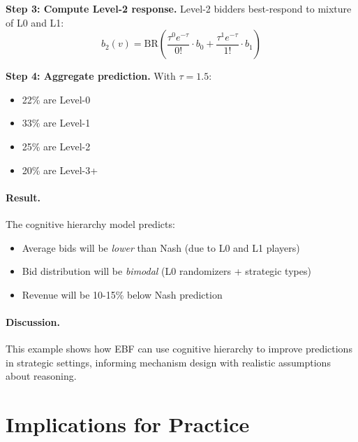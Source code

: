 \textbf{Step 3: Compute Level-2 response.}
Level-2 bidders best-respond to mixture of L0 and L1:
\begin{equation}
b_2(v) = \text{BR}\left(\frac{\tau^0 e^{-\tau}}{0!} \cdot b_0 + \frac{\tau^1 e^{-\tau}}{1!} \cdot b_1\right)
\end{equation}

\textbf{Step 4: Aggregate prediction.}
With $\tau = 1.5$:
\begin{itemize}[nosep]
\item 22\% are Level-0
\item 33\% are Level-1
\item 25\% are Level-2
\item 20\% are Level-3+
\end{itemize}

\paragraph{Result.}
The cognitive hierarchy model predicts:
\begin{itemize}[nosep]
\item Average bids will be \textit{lower} than Nash (due to L0 and L1 players)
\item Bid distribution will be \textit{bimodal} (L0 randomizers + strategic types)
\item Revenue will be 10-15\% below Nash prediction
\end{itemize}

\paragraph{Discussion.}
This example shows how EBF can use cognitive hierarchy to improve predictions in strategic settings, informing mechanism design with realistic assumptions about reasoning.


\section{Implications for Practice}
\label{sec:ca-practice}

